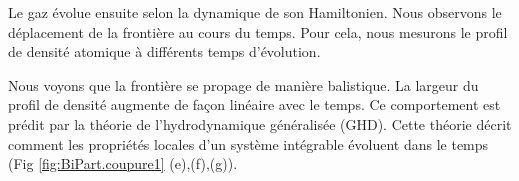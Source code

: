 			
			
					

			
			


Le gaz évolue ensuite selon la dynamique de son Hamiltonien. Nous observons le déplacement de la frontière au cours du temps. Pour cela, nous mesurons le profil de densité atomique à différents temps d’évolution.

Nous voyons que la frontière se propage de manière balistique. La largeur du profil de densité augmente de façon linéaire avec le temps. Ce comportement est prédit par la théorie de l’hydrodynamique généralisée (GHD). Cette théorie décrit comment les propriétés locales d’un système intégrable évoluent dans le temps (Fig \ref{fig:BiPart.coupure1} (e),(f),(g)). %

